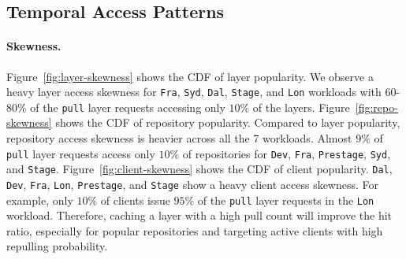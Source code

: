 \subsection{Temporal Access Patterns}



\paragraph{Skewness.}
Figure~\ref{fig:layer-skewness} shows the CDF of layer popularity.
We observe a heavy layer access skewness for \texttt{Fra}, \texttt{Syd}, \texttt{Dal}, \texttt{Stage}, and \texttt{Lon} workloads with $60$-$80$\%  of the \texttt{pull} layer requests accessing only $10$\% of the layers.
Figure~\ref{fig:repo-skewness} shows the CDF of repository popularity.
Compared to layer popularity, 
repository access skewness is heavier across all the 7 workloads.
Almost $9$\% of \texttt{pull} layer requests access only $10$\% of repositories for 
\texttt{Dev}, \texttt{Fra}, \texttt{Prestage}, \texttt{Syd}, and \texttt{Stage}.
Figure~\ref{fig:client-skewness} shows the CDF of client popularity.
\texttt{Dal}, \texttt{Dev}, \texttt{Fra}, \texttt{Lon}, \texttt{Prestage}, and \texttt{Stage} show a heavy client access skewness. 
For example, only $10$\% of clients issue $95$\% of the \texttt{pull} layer requests in the \texttt{Lon} workload.
Therefore, caching a layer with a high pull count will improve the hit ratio, 
especially for popular repositories and targeting active clients with high repulling probability.

